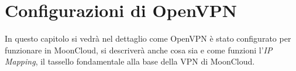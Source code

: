 \chapter{Configurazioni di OpenVPN}

In questo capitolo si vedrà nel dettaglio come OpenVPN è stato configurato
per funzionare in MoonCloud, si descriverà anche cosa sia e come funzioni l'\textit{IP Mapping},
il tassello fondamentale alla base della VPN di MoonCloud.









